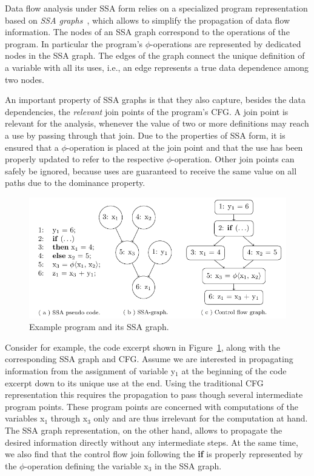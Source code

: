 Data flow analysis under SSA form relies on a specialized program
representation based on \emph{SSA graphs}~\cite{novillo:bib:CFRWZ91}, which
allows to simplify the propagation of data flow information. The nodes of an
SSA graph correspond to the operations of the program. In particular the
program's $\phi$-operations are represented by dedicated nodes in the SSA graph.
The edges of the graph connect the unique definition of a variable with all its
uses, i.e., an edge represents a true data dependence among two nodes.

An important property of SSA graphs is that they also capture, besides the data
dependencies, the \emph{relevant} join points of the program's CFG. A join point
is relevant for the analysis, whenever the value of two or more definitions may
reach a use by passing through that join. Due to the properties of SSA form, it
is ensured that a $\phi$-operation is placed at the join point and that the use
has been properly updated to refer to the respective $\phi$-operation. Other
join points can safely be ignored, because uses are guaranteed to receive the
same value on all paths due to the dominance property.

\begin{figure}[t]
  \begin{center}
    \includegraphics{ssa_graph}
  \end{center}
  \vspace{-2em}
  \caption{Example program and its SSA graph.}
  \label{novillo:fig:ssa_graph}
\end{figure}

Consider for example, the code excerpt shown in
Figure~\ref{novillo:fig:ssa_graph}, along with the corresponding SSA graph and
CFG. Assume we are interested in propagating information from the assignment of
variable y$_1$ at the beginning of the code excerpt down to its unique use at
the end. Using the traditional CFG representation this requires the propagation
to pass though several intermediate program points. These program points are
concerned with computations of the variables x$_1$  through x$_3$ only and are
thus irrelevant for the computation at hand. The SSA graph representation, on
the other hand, allows to propagate the desired information directly without any
intermediate steps. At the same time, we also find that the control flow join
following the \textbf{if} is properly represented by the $\phi$-operation
defining the variable x$_3$ in the SSA graph.

